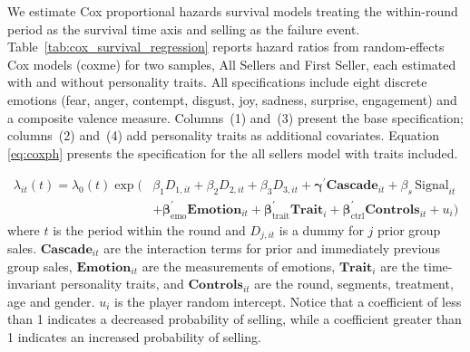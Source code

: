 \documentclass[thesis]{uathesis}
\begin{document}
\begin{body}
We estimate Cox proportional hazards survival models treating the within-round period as the survival time axis and selling as the failure event. Table~\ref{tab:cox_survival_regression} reports hazard ratios from random-effects Cox models (coxme) for two samples, All Sellers and First Seller, each estimated with and without personality traits. All specifications include eight discrete emotions (fear, anger, contempt, disgust, joy, sadness, surprise, engagement) and a composite valence measure. Columns~(1) and~(3) present the base specification; columns~(2) and~(4) add personality traits as additional covariates. Equation \ref{eq:coxph} presents the specification for the all sellers model with traits included.

  \begin{equation}
  \begin{split}
      \lambda_{it}(t) = \lambda_0(t) \exp\bigl(
      & \beta_1 D_{1,it} + \beta_2 D_{2,it} + \beta_3 D_{3,it}
     + \boldsymbol{\gamma}^{\prime} \mathbf{Cascade}_{it} + \beta_s \, \text{Signal}_{it} \\
      & + \boldsymbol{\beta}_{\text{emo}}^{\prime} \mathbf{Emotion}_{it} + \boldsymbol{\beta}_{\text{trait}}^{\prime} \mathbf{Trait}_i  + \boldsymbol{\beta}_{\text{ctrl}}^{\prime} \mathbf{Controls}_{it} + u_i \bigr)
  \end{split}
  \label{eq:coxph}
  \end{equation}
where  $t$ is the period within the round and $D_{j,it}$ is a dummy for $j$ prior group sales. $\mathbf{Cascade}_{it}$ are the interaction terms for prior and immediately previous group sales, $\mathbf{Emotion}_{it}$ are the measurements of emotions, $\mathbf{Trait}_{i}$ are the time-invariant personality traits, and $\mathbf{Controls}_{it}$ are the round, segments, treatment, age and gender. $u_i$ is the player random intercept.  Notice that a coefficient of less than 1 indicates a decreased probability of selling, while a coefficient greater than 1 indicates an increased probability of selling.


\end{body}
\end{document}
